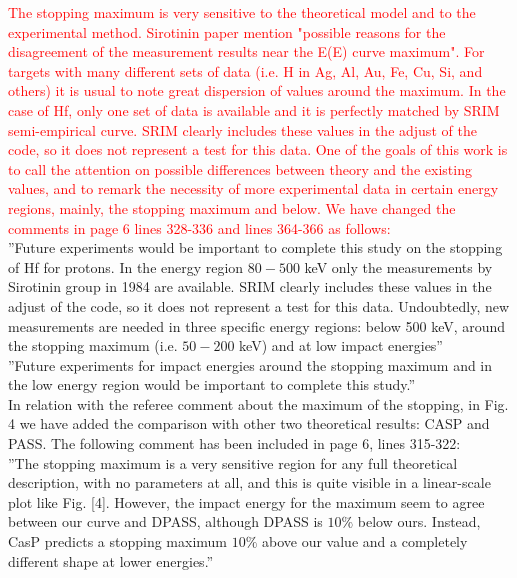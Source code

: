\documentclass[a4paper,10pt]{article}
\def\reply#1{\vspace{0.1cm}\textcolor{red}{#1}}
\begin{document}
\reply{The stopping maximum is very sensitive to the theoretical model and to the experimental method. Sirotinin paper mention "possible reasons for the disagreement of the measurement results near the E(E) curve maximum". 
For targets with many different sets of data (i.e. H in Ag, Al, Au, Fe, Cu, Si, and others) it is usual to note great dispersion of values around the maximum. In the case of Hf, only one set of data is available and it is perfectly matched by SRIM semi-empirical curve. SRIM clearly includes these values in the adjust of the code, so it does not represent a test for this data. One of the goals of this work is to call the attention on possible differences between theory and the existing values, and to remark the necessity of more experimental data in certain energy regions, mainly, the stopping maximum and below. We have changed the comments in page 6 lines 328-336 and lines 364-366 as follows:} \\ {\small ''Future experiments  would be important to complete this study on the stopping of Hf for protons. In the energy region $80-500$ keV only the measurements by Sirotinin group in 1984 are available. SRIM clearly includes these values in the adjust of the code, so it does not represent a test for this data. Undoubtedly, new measurements are needed in three specific energy regions: below 500 keV, around the stopping maximum (i.e. $50-200$ keV) and at low impact energies''} \\ {\small ''Future experiments for impact energies around the stopping maximum and in the low energy region would be important to complete this study.''} \\ {\color{red} In relation with the referee comment about the maximum of the stopping, in Fig. 4 we have added the comparison with other two theoretical results: CASP and PASS. The following comment has been included in page 6, lines 315-322:} \\ {\small ''The stopping maximum is a very sensitive region for any full theoretical description, with no parameters at all, and this is quite visible in a linear-scale plot like Fig. [4]. However, the impact energy for the maximum seem to agree between our curve and DPASS, although DPASS is $10 \%$ below ours. Instead, CasP predicts a stopping maximum $10 \%$ above our value and a completely different shape at lower energies.''}
\end{document}
